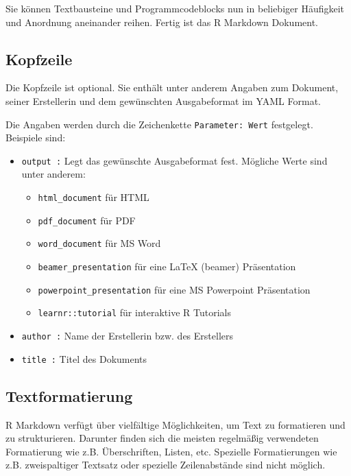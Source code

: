 \documentclass[
]{article}
\providecommand{\tightlist}{%
  \setlength{\itemsep}{0pt}\setlength{\parskip}{0pt}}
\begin{document}
Sie können Textbausteine und Programmcodeblocks nun in beliebiger
Häufigkeit und Anordnung aneinander reihen. Fertig ist das R Markdown
Dokument.

\hypertarget{kopfzeile}{%
\subsection{Kopfzeile}\label{kopfzeile}}

Die Kopfzeile ist optional. Sie enthält unter anderem Angaben zum
Dokument, seiner Erstellerin und dem gewünschten Ausgabeformat im YAML
Format.

Die Angaben werden durch die Zeichenkette \texttt{Parameter:\ Wert}
festgelegt. Beispiele sind:

\begin{itemize}
\tightlist
\item
  \texttt{output\ :} Legt das gewünschte Ausgabeformat fest. Mögliche
  Werte sind unter anderem:

  \begin{itemize}
  \tightlist
  \item
    \texttt{html\_document} für HTML
  \item
    \texttt{pdf\_document} für PDF
  \item
    \texttt{word\_document} für MS Word
  \item
    \texttt{beamer\_presentation} für eine LaTeX (beamer) Präsentation
  \item
    \texttt{powerpoint\_presentation} für eine MS Powerpoint
    Präsentation
  \item
    \texttt{learnr::tutorial} für interaktive R Tutorials
  \end{itemize}
\item
  \texttt{author\ :} Name der Erstellerin bzw. des Erstellers
\item
  \texttt{title\ :} Titel des Dokuments
\end{itemize}

\hypertarget{textformatierung}{%
\subsection{Textformatierung}\label{textformatierung}}

R Markdown verfügt über vielfältige Möglichkeiten, um Text zu
formatieren und zu strukturieren. Darunter finden sich die meisten
regelmäßig verwendeten Formatierung wie z.B. Überschriften, Listen, etc.
Spezielle Formatierungen wie z.B. zweispaltiger Textsatz oder spezielle
Zeilenabstände sind nicht möglich.
\end{document}
